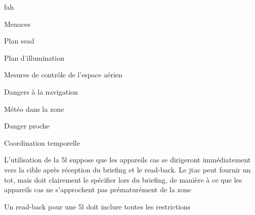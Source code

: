 \begin{e1}
\begin{e2}
\begin{e3}
			\begin{e4}
				\item \gls{fah}
				\item Menaces
				\item Plan \gls{sead}
				\item Plan d'illumination
				\item Mesures de contrôle de l'espace aérien
				\item Dangers à la navigation
				\item Météo dans la zone
				\item Danger proche
				\item Coordination temporelle
			\end{e4}
			\item L'utilisation de la \gls{5l} suppose que les appareils \gls{cas} se dirigeront immédiatement vers la cible après réception du briefing et le read-back. Le \gls{jtac} peut fournir un \gls{tot}, mais doit clairement le spécifier lors du briefing, de manière à ce que les appareils \gls{cas} ne s'approchent pas prématurément de la zone
		\end{e3}
		\item Un read-back pour une \gls{5l} doit inclure toutes les restrictions

	\end{e2}
\end{e1}